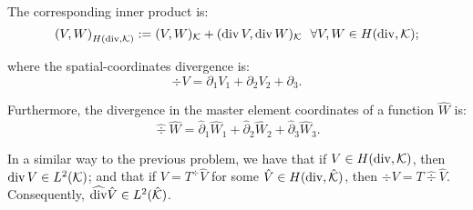 \noindent The corresponding inner product is:
% 
\begin{equation}
    \left(V,W\right)_{H(\operatorname{div},\mathcal{K})}:=(V,W)_{\mathcal{K}}+(\operatorname{div} V,\operatorname{div} W)_{\mathcal{K}}\ \ \forall V,W\in H(\operatorname{div},\mathcal{K});
\end{equation}

\noindent where the spatial-coordinates divergence is:
\begin{equation}
    \div V=\partial_1 V_1+\partial_2 V_2+\partial_3 .
\end{equation}

\noindent Furthermore, the divergence in the master element coordinates of a function $\hat{W}$ is:
% 
\begin{equation}
    \widehat{\div}\hat{W}=\hat{\partial}_1 \hat{W}_1+\hat{\partial}_2 \hat{W}_2+\hat{\partial}_3 \hat{W}_3.
\end{equation}

In a similar way to the previous problem, we have that if $V\in H(\operatorname{div},\mathcal{K})$, then $\operatorname{div} V\in L^2(\mathcal{K})$; and that if $V=T^{\div}\hat{V}$ for some $\hat{V}\in H(\operatorname{div},\hat{\mathcal{K}})$, then $\div V=T\widehat{\div}\hat{V}$. Consequently, $\widehat{\operatorname{div}}\hat{V}\in L^2(\hat{\mathcal{K}})$.

